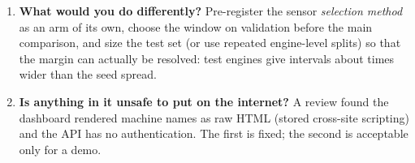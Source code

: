 \documentclass[11pt,a4paper]{article}
\begin{document}
\begin{enumerate}[leftmargin=*]
\BaselineTrivialMeanFullTwoOneStatusAccPct{}\%.
\item \textbf{What would you do differently?} Pre-register the sensor \emph{selection method} as an arm of its own,
choose the window on validation before the main comparison, and size the test set (or use repeated engine-level
splits) so that the margin can actually be resolved: \SplitTest{} test engines give intervals about
\BootCiOverSeed{} times wider than the seed spread.
\item \textbf{Is anything in it unsafe to put on the internet?} A review found the dashboard rendered machine names
as raw HTML (stored cross-site scripting) and the API has no authentication. The first is fixed; the second is
acceptable only for a demo.
\end{enumerate}

\end{document}
